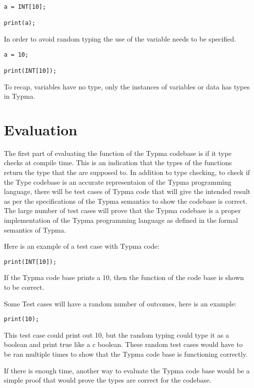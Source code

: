 \documentclass[10pt,twocolumn]{article}
\begin{document}
\begin{lstlisting}
a = INT[10];

print(a);
\end{lstlisting}

In order to avoid random typing the use of the variable needs to be specified.

\begin{lstlisting}
a = 10;

print(INT[10]);
\end{lstlisting}

To recap, variables have no type, only the instances of variables or data has types in Typma.

\section{Evaluation} 

The first part of evaluating the function of the Typma codebase is if it type checks at compile time. This is an indication that the types of the functions return the type that the are supposed to. In addition to type checking, to check if the Type codebase is an accurate representaion of the Typma programming language, there will be test cases of Typma code that will give the intended result as per the specifications of the Typma semantics to show the codebase is correct. The large number of test cases will prove that the Typma codebase is a proper implementation of the Typma programming language as defined in the formal semantics of Typma.

Here is an example of a test case with Typma code:

\begin{lstlisting}
print(INT[10]);
\end{lstlisting}

If the Typma code base prints a 10, then the function of the code base is shown to be correct.

Some Test cases will have a random number of outcomes, here is an example:

\begin{lstlisting}
print(10);
\end{lstlisting}

This test case could print out 10, but the random typing could type it as a boolean and print true like a c boolean. These random test cases would have to be ran multiple times to show that the Typma code base is functioning correctly.

If there is enough time, another way to evaluate the Typma code base would be a simple proof that would prove the types are correct for the codebase.
\end{document}
